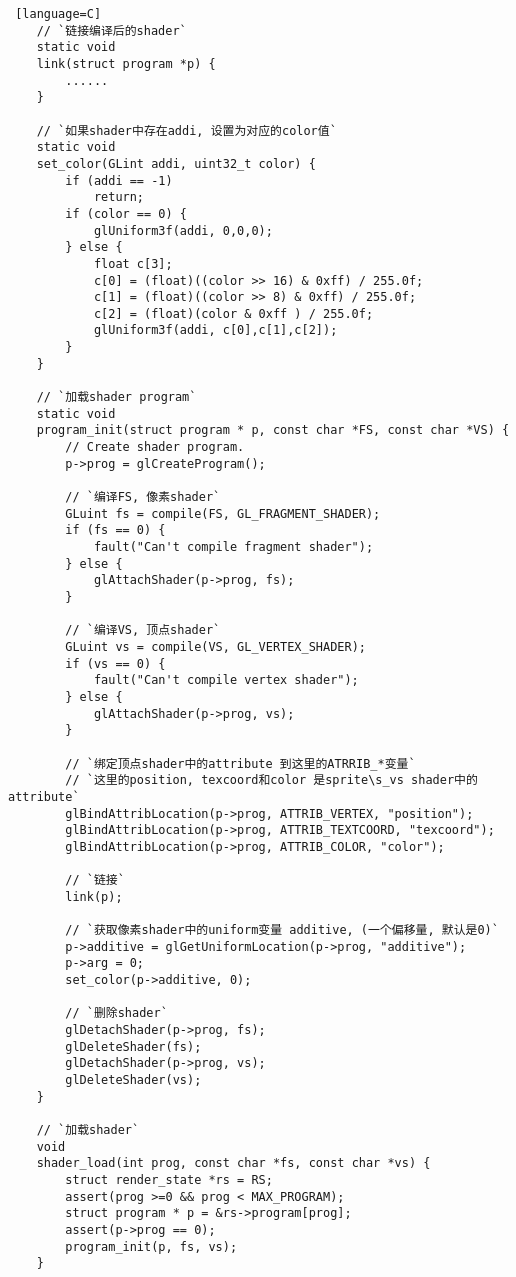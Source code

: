 {\begin {lstlisting} [language=C]
    // `链接编译后的shader`
    static void
    link(struct program *p) {
        ......
    }

    // `如果shader中存在addi, 设置为对应的color值`
    static void
    set_color(GLint addi, uint32_t color) {
        if (addi == -1)
            return;
        if (color == 0) {
            glUniform3f(addi, 0,0,0);
        } else {
            float c[3];
            c[0] = (float)((color >> 16) & 0xff) / 255.0f;
            c[1] = (float)((color >> 8) & 0xff) / 255.0f;
            c[2] = (float)(color & 0xff ) / 255.0f;
            glUniform3f(addi, c[0],c[1],c[2]);
        }
    }

    // `加载shader program`
    static void
    program_init(struct program * p, const char *FS, const char *VS) {
        // Create shader program.
        p->prog = glCreateProgram();

        // `编译FS, 像素shader`
        GLuint fs = compile(FS, GL_FRAGMENT_SHADER);
        if (fs == 0) {
            fault("Can't compile fragment shader");
        } else {
            glAttachShader(p->prog, fs);
        }

        // `编译VS, 顶点shader`
        GLuint vs = compile(VS, GL_VERTEX_SHADER);
        if (vs == 0) {
            fault("Can't compile vertex shader");
        } else {
            glAttachShader(p->prog, vs);
        }

        // `绑定顶点shader中的attribute 到这里的ATRRIB_*变量`
        // `这里的position, texcoord和color 是sprite\s_vs shader中的attribute`
        glBindAttribLocation(p->prog, ATTRIB_VERTEX, "position");
        glBindAttribLocation(p->prog, ATTRIB_TEXTCOORD, "texcoord");
        glBindAttribLocation(p->prog, ATTRIB_COLOR, "color");

        // `链接`
        link(p);

        // `获取像素shader中的uniform变量 additive, (一个偏移量, 默认是0)`
        p->additive = glGetUniformLocation(p->prog, "additive");
        p->arg = 0;
        set_color(p->additive, 0);

        // `删除shader`
        glDetachShader(p->prog, fs);
        glDeleteShader(fs);
        glDetachShader(p->prog, vs);
        glDeleteShader(vs);
    }

    // `加载shader`
    void
    shader_load(int prog, const char *fs, const char *vs) {
        struct render_state *rs = RS;
        assert(prog >=0 && prog < MAX_PROGRAM);
        struct program * p = &rs->program[prog];
        assert(p->prog == 0);
        program_init(p, fs, vs);
    }
    \end {lstlisting}
}



